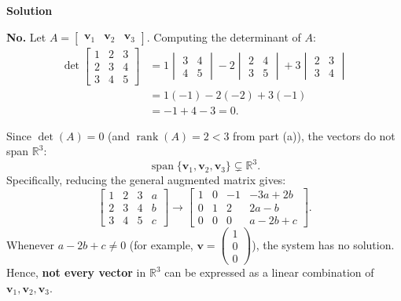 \documentclass[12pt,a4paper]{article}
\begin{document}
\textbf{Solution}

\textbf{No.} Let $A = \begin{bmatrix} \mathbf{v}_1 & \mathbf{v}_2 & \mathbf{v}_3 \end{bmatrix}$. Computing the determinant of $A$:
\begin{align*}
	\det \begin{bmatrix}
		1 & 2 & 3 \\
		2 & 3 & 4 \\
		3 & 4 & 5
	\end{bmatrix} &= 1\begin{vmatrix} 3 & 4 \\ 4 & 5 \end{vmatrix} - 2\begin{vmatrix} 2 & 4 \\ 3 & 5 \end{vmatrix} + 3\begin{vmatrix} 2 & 3 \\ 3 & 4 \end{vmatrix} \\
	&= 1(-1) - 2(-2) + 3(-1) \\
	&= -1 + 4 - 3 = 0.
\end{align*}

Since $\det(A) = 0$ (and $\operatorname{rank}(A) = 2 < 3$ from part (a)), the vectors do not span $\mathbb{R}^3$:
\[
\operatorname{span}\{\mathbf{v}_1, \mathbf{v}_2, \mathbf{v}_3\} \subsetneq \mathbb{R}^3.
\]
Specifically, reducing the general augmented matrix gives:
\[
\begin{bmatrix}
	1 & 2 & 3 & a \\
	2 & 3 & 4 & b \\
	3 & 4 & 5 & c
\end{bmatrix}
\longrightarrow
\begin{bmatrix}
	1 & 0 & -1 & -3a + 2b \\
	0 & 1 & 2 & 2a - b \\
	0 & 0 & 0 & a - 2b + c
\end{bmatrix}.
\]
Whenever $a - 2b + c \neq 0$ (for example, $\mathbf{v} = \begin{pmatrix} 1 \\ 0 \\ 0 \end{pmatrix}$), the system has no solution. Hence, \textbf{not every vector} in $\mathbb{R}^3$ can be expressed as a linear combination of $\mathbf{v}_1, \mathbf{v}_2, \mathbf{v}_3$.

\par\nopagebreak\vspace{1cm}
\end{document}
